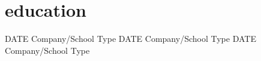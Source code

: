 \section{education}

\begin{entrylist}
    \entry
    {DATE}
    {Company/School}
    {Type}
    {\blinddescription[2]}
    \entry
    {DATE}
    {Company/School}
    {Type}
    {\blinddescription[1]}
    \entry
    {DATE}
    {Company/School}
    {Type}
    {\blinddescription[1]}
\end{entrylist}

